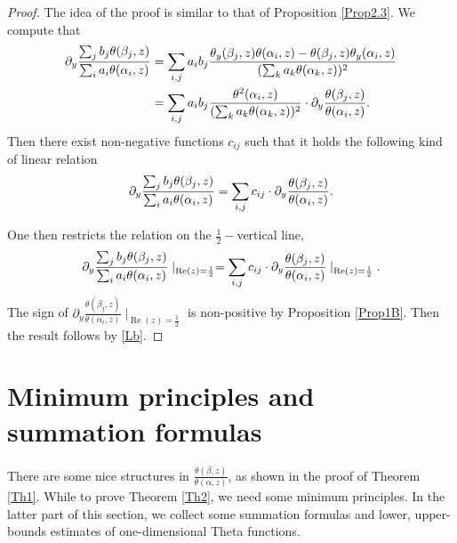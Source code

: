 \documentclass[reqno,english]{amsart}
\newtheorem{open problem}{Open Problem}[section]
\newtheorem{open question}{Open Question}[section]
\newtheorem{open questions on hexagonal lattice}{Open Questions on hexagonal lattice}[section]
\renewcommand{\Re}{\operatorname{Re}}
\begin{document}
\begin{proof} The idea of the proof is similar to that of Proposition \ref{Prop2.3}. We compute that
\begin{equation}\aligned\nonumber
\partial_y\frac{\sum_{j}b_j\theta(\beta_j,z)}{\sum_{i}a_i\theta(\alpha_i,z)}
&=\sum_{i,j}a_ib_j\frac{
\theta_y(\beta_j,z)\theta(\alpha_i,z)-\theta(\beta_j,z)\theta_y(\alpha_i,z)
}{(\sum_k a_k\theta(\alpha_k,z))^2}
\\
&
=\sum_{i,j}a_ib_j\frac{\theta^2(\alpha_i,z)}{(\sum_k a_k\theta(\alpha_k,z))^2}\cdot \partial_y\frac{\theta(\beta_j,z)}{\theta(\alpha_i,z)}.
\endaligned\end{equation}
Then there exist non-negative functions $c_{ij}$ such that it holds the following kind of linear relation
\begin{equation}\aligned\nonumber
\partial_y\frac{\sum_{j}b_j\theta(\beta_j,z)}{\sum_{i}a_i\theta(\alpha_i,z)}
=\sum_{i,j}c_{ij} \cdot\partial_y\frac{\theta(\beta_j,z)}{\theta(\alpha_i,z)}.
\endaligned\end{equation}

One then restricts the relation on the $\frac{1}{2}-$vertical line,
\begin{equation}\aligned\label{Lb}
\partial_y\frac{\sum_{j}b_j\theta(\beta_j,z)}{\sum_{i}a_i\theta(\alpha_i,z)}\mid_{\Re(z)=\frac{1}{2}}
=\sum_{i,j}c_{ij} \cdot\partial_y\frac{\theta(\beta_j,z)}{\theta(\alpha_i,z)}\mid_{\Re(z)=\frac{1}{2}}.
\endaligned\end{equation}
The sign of $\partial_y\frac{\theta(\beta_j,z)}{\theta(\alpha_i,z)}\mid_{\Re(z)=\frac{1}{2}}$ is non-positive by Proposition \ref{Prop1B}. Then the result follows by \eqref{Lb}.

\end{proof}

\section{Minimum principles and summation formulas}
\setcounter{equation}{0}

There are some nice structures in $\frac{\theta(\beta,z)}{\theta(\alpha,z)}$, as shown in the proof of Theorem \ref{Th1}.
While to prove Theorem \ref{Th2}, we need some minimum principles. In the latter part of this section, we collect some summation formulas and lower, upper-bounds estimates of one-dimensional Theta functions.
\end{document}
